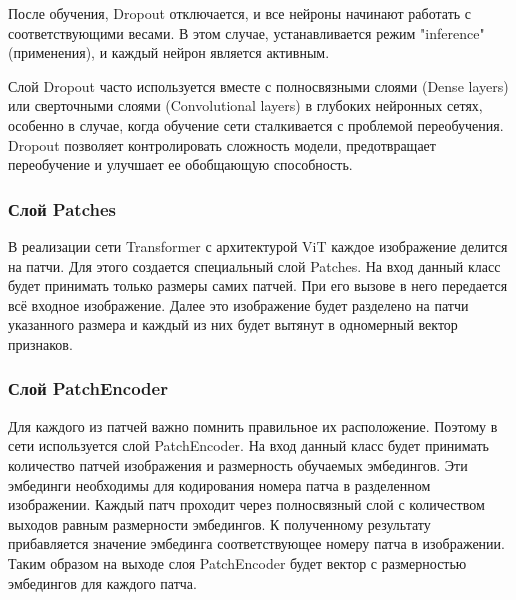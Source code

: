 \documentclass[14pt,a4paper]{extarticle}
\begin{document}
После обучения, Dropout отключается, и все нейроны начинают работать с соответствующими весами. В этом случае, устанавливается режим "inference" (применения), и каждый нейрон является активным.

Слой Dropout часто используется вместе с полносвязными слоями (Dense layers) или сверточными слоями (Convolutional layers) в глубоких нейронных сетях, особенно в случае, когда обучение сети сталкивается с проблемой переобучения. Dropout позволяет контролировать сложность модели, предотвращает переобучение и улучшает ее обобщающую способность.


\subsubsection*{Слой Patches}
В реализации сети Transformer с архитектурой ViT каждое изображение делится на патчи. Для этого создается специальный слой Patches. На вход данный класс будет принимать только размеры самих патчей. При его вызове в него передается всё входное изображение. Далее это изображение будет разделено на патчи указанного размера и каждый из них будет вытянут в одномерный вектор признаков.


\subsubsection*{Слой PatchEncoder}
Для каждого из патчей важно помнить правильное их расположение. Поэтому в сети используется слой PatchEncoder. На вход данный класс будет принимать количество патчей изображения и размерность обучаемых эмбедингов. Эти эмбединги необходимы для кодирования номера патча в разделенном изображении. Каждый патч проходит через полносвязный слой с количеством выходов равным размерности эмбедингов. К полученному результату прибавляется значение эмбединга соответствующее номеру патча в изображении. Таким образом на выходе слоя PatchEncoder будет вектор с размерностью эмбедингов для каждого патча.


%
\end{document}
